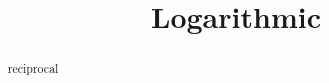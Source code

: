 \documentclass{ximera}
\title{Logarithmic}
\begin{document}
\begin{abstract}
reciprocal
\end{abstract}
\maketitle
\end{document}
